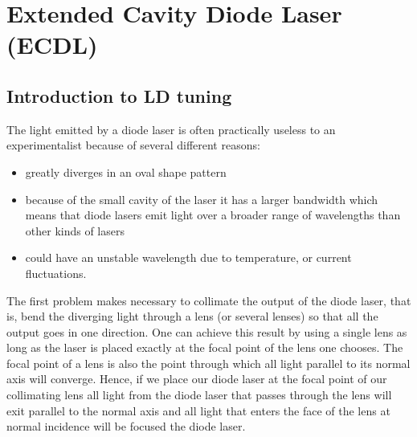 \chapter{Extended Cavity Diode Laser (ECDL)}\label{ECDL}
	\section{Introduction to LD tuning}

The light emitted by a diode laser is often practically useless to an experimentalist because of several different reasons:
\begin{itemize}
 \item greatly diverges in an oval shape pattern
 \item because of the small cavity of the laser it has a larger bandwidth which means that diode lasers emit light over a broader range of wavelengths than other kinds of lasers
 \item could have an unstable wavelength due to temperature, or current fluctuations.
\end{itemize}

The first problem makes necessary to collimate the output of the diode laser, that is, bend the diverging light through a lens (or several lenses) so that all the output goes in one direction. One can achieve this result by using a single lens as long as the laser is placed exactly at the focal  point of the lens one chooses. The focal point of a lens is also the point through which all light parallel to its normal axis will converge. Hence, if we place our diode laser at the focal point of our collimating lens all light from the diode laser that passes through the lens will exit parallel to the normal axis and all light that enters the face of the lens at normal incidence will be focused the diode laser.


